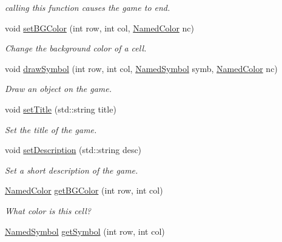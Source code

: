 \begin{DoxyCompactItemize}
\begin{DoxyCompactList}\small\item\em calling this function causes the game to end. \end{DoxyCompactList}\item 
void \mbox{\hyperlink{classbridges_1_1game_1_1_game_base_ab667bbca1c81e5fb3aa8d81d70fe8cd2}{set\+B\+G\+Color}} (int row, int col, \mbox{\hyperlink{namespacebridges_1_1game_afaa832a4322b25b6a4ebfba832f10f26}{Named\+Color}} nc)
\begin{DoxyCompactList}\small\item\em Change the background color of a cell. \end{DoxyCompactList}\item 
void \mbox{\hyperlink{classbridges_1_1game_1_1_game_base_a415fa8f70bef364dfa966f2a86048901}{draw\+Symbol}} (int row, int col, \mbox{\hyperlink{namespacebridges_1_1game_ab9a19c7ab6e2ebac2f95180e21733487}{Named\+Symbol}} symb, \mbox{\hyperlink{namespacebridges_1_1game_afaa832a4322b25b6a4ebfba832f10f26}{Named\+Color}} nc)
\begin{DoxyCompactList}\small\item\em Draw an object on the game. \end{DoxyCompactList}\item 
void \mbox{\hyperlink{classbridges_1_1game_1_1_game_base_a108c2e3050a4d3f3af9950434e97102a}{set\+Title}} (std\+::string title)
\begin{DoxyCompactList}\small\item\em Set the title of the game. \end{DoxyCompactList}\item 
void \mbox{\hyperlink{classbridges_1_1game_1_1_game_base_ab490d78e11e4117c3a4915c78afa0973}{set\+Description}} (std\+::string desc)
\begin{DoxyCompactList}\small\item\em Set a short description of the game. \end{DoxyCompactList}\item 
\mbox{\hyperlink{namespacebridges_1_1game_afaa832a4322b25b6a4ebfba832f10f26}{Named\+Color}} \mbox{\hyperlink{classbridges_1_1game_1_1_game_base_a924f911774a89d18ccb391bb28fd703c}{get\+B\+G\+Color}} (int row, int col)
\begin{DoxyCompactList}\small\item\em What color is this cell? \end{DoxyCompactList}\item 
\mbox{\hyperlink{namespacebridges_1_1game_ab9a19c7ab6e2ebac2f95180e21733487}{Named\+Symbol}} \mbox{\hyperlink{classbridges_1_1game_1_1_game_base_a0dfec715b0ed49c37b4b6689f2470b25}{get\+Symbol}} (int row, int col)

\end{DoxyCompactItemize}
